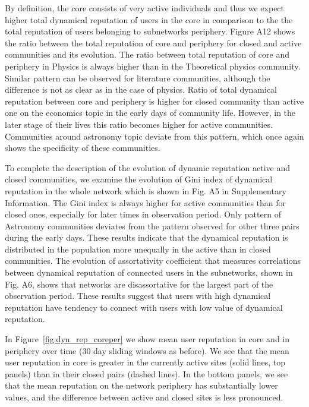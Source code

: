 By definition, the core consists of very active individuals and thus we expect higher total dynamical reputation of users in the core in comparison to the the total reputation of users belonging to subnetworks periphery. Figure A12 shows the ratio between the total reputation of core and periphery for closed and active communities and its evolution. The ratio between total reputation of core and periphery in Physics is always higher than in the Theoretical physics community. Similar pattern can be observed for literature communities, although the difference is not as clear as in the case of physics. Ratio of total dynamical reputation between core and periphery is higher for closed community than active one on the economics topic in the early days of community life. However, in the later stage of their lives this ratio becomes higher for active communities. Communities around astronomy topic deviate from this pattern, which once again shows the specificity of these communities. 

To complete the description of the evolution of dynamic reputation active and closed communities, we examine the evolution of Gini index of dynamical reputation in the whole network which is shown in Fig. A5 in Supplementary Information. The Gini index is always higher for active communities than for closed ones, especially for later times in observation period. Only pattern of Astronomy communities deviates from the pattern observed for other three pairs during the early days. These results indicate that the dynamical reputation is distributed in the population more unequally in the active than in closed communities. The evolution of assortativity coefficient that measures correlations between dynamical reputation of connected users in the subnetworks, shown in Fig. A6, shows that networks are disassortative for the largest part of the observation period. These results suggest that users with high dynamical reputation have tendency to connect with users with low value of dynamical reputation. 


In Figure~\ref{fig:dyn_rep_coreper} we show mean user reputation in core and in periphery over time (30 day sliding windows as before). We see that the mean user reputation in core is greater in the currently active sites (solid lines, top panels) than in their closed pairs (dashed lines). In the bottom panels, we see that the mean reputation on the network periphery has substantially lower values, and the difference between active and closed sites is less pronounced. 

